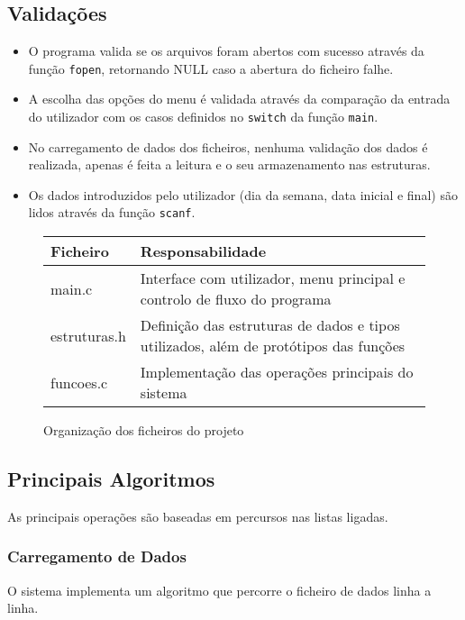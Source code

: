 \documentclass[a4paper,12pt]{report}
\begin{document}
\subsection{Validações}
\begin{itemize}
    \item O programa valida se os arquivos foram abertos com sucesso através da função \texttt{fopen}, retornando NULL caso a abertura do ficheiro falhe.
    \item A escolha das opções do menu é validada através da comparação da entrada do utilizador com os casos definidos no \texttt{switch} da função \texttt{main}.
    \item  No carregamento de dados dos ficheiros, nenhuma validação dos dados é realizada, apenas é feita a leitura e o seu armazenamento nas estruturas.
     \item Os dados introduzidos pelo utilizador (dia da semana, data inicial e final) são lidos através da função \texttt{scanf}.
\end{itemize}

\begin{figure}[htb]
    \centering
    \begin{tabular}{|l|p{10cm}|}
        \hline
        \textbf{Ficheiro} & \textbf{Responsabilidade} \\
        \hline
        main.c & Interface com utilizador, menu principal e controlo de fluxo do programa \\
        \hline
         estruturas.h & Definição das estruturas de dados e tipos utilizados, além de protótipos das funções \\
        \hline
        funcoes.c & Implementação das operações principais do sistema \\
        \hline
    \end{tabular}
    \caption{Organização dos ficheiros do projeto}
    \label{fig:ficheiros}
\end{figure}

\subsection{Principais Algoritmos}
As principais operações são baseadas em percursos nas listas ligadas.

\subsubsection{Carregamento de Dados}
O sistema implementa um algoritmo que percorre o ficheiro de dados linha a linha.
\end{document}
